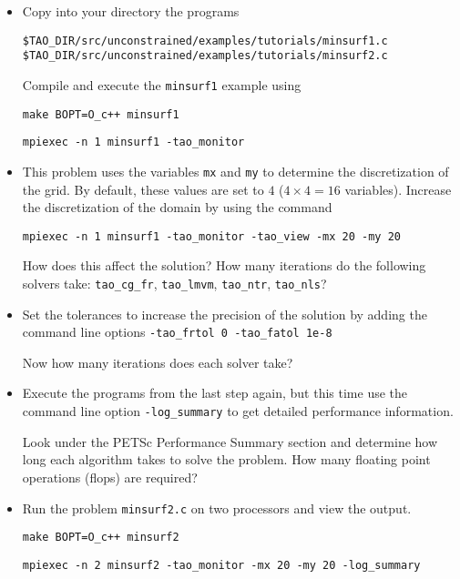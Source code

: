 \documentclass[11pt]{article}
\begin{document}
\begin{enumerate}
\begin{itemize}

\item
Copy into your directory the programs
\begin{alltt}
\$TAO_DIR/src/unconstrained/examples/tutorials/minsurf1.c
\$TAO_DIR/src/unconstrained/examples/tutorials/minsurf2.c

\end{alltt}
    
Compile and execute the \texttt{minsurf1} example using
    
\quad \texttt{make BOPT=O\_c++ minsurf1}

\quad \texttt{mpiexec -n 1 minsurf1 -tao\_monitor}

\item
This problem uses the variables {\tt mx} and {\tt my} to determine
the discretization of the grid.  By default, these values are set to
$4$ ($4 \times 4 = 16$ variables). Increase the discretization of the 
domain by using the command 

\quad \texttt{mpiexec -n 1 minsurf1 -tao\_monitor -tao\_view -mx 20 -my 20}

How does this affect the solution?
How many iterations do the following solvers take: \texttt{tao\_cg\_fr},
\texttt{tao\_lmvm}, \texttt{tao\_ntr}, \texttt{tao\_nls}?

\item
Set the tolerances to increase the precision of the solution by adding the
command line options \texttt{-tao\_frtol 0 -tao\_fatol 1e-8}

Now how many iterations does each solver take?

\item
Execute the programs from the last step again, but this time use the command line option 
\texttt{-log\_summary} to get detailed performance information.

Look under the PETSc Performance Summary section and determine how long
each algorithm takes to solve the problem. How many floating point operations (flops) are required? 


\item
Run the problem \texttt{minsurf2.c} on two processors and view the output.

\quad \texttt{make BOPT=O\_c++ minsurf2}

\quad \texttt{mpiexec -n 2 minsurf2 -tao\_monitor -mx 20 -my 20 -log\_summary}

\end{itemize}

\end{enumerate}
\end{document}
